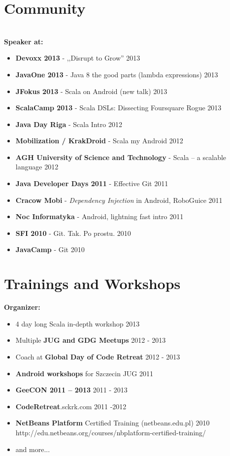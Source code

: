 \documentclass{res}
\begin{document}
\begin{resume}
\section{Community}
\\ 
\textbf{Speaker at:}
\begin{itemize}
 \item \textbf{Devoxx 2013} - ,,Disrupt to Grow'' \hfill 2013
 \item \textbf{JavaOne 2013} - Java 8 the good parts (lambda expressions) \hfill 2013
 \item \textbf{JFokus 2013} - Scala on Android (new talk)    \hfill 2013
 \item \textbf{ScalaCamp 2013} - Scala DSLs: Dissecting Foursquare Rogue    \hfill 2013
 \item\textbf{Java Day Riga} - Scala Intro \hfill 2012
 \item \textbf{Mobilization / KrakDroid} - Scala my Android    \hfill 2012
 \item \textbf{AGH University of Science and Technology} - Scala -- a scalable language    \hfill 2012
 \item \textbf{Java Developer Days 2011} - Effective Git    \hfill 2011
 \item \textbf{Cracow Mobi} - \textit{Dependency Injection} in Android, RoboGuice    \hfill 2011
 \item \textbf{Noc Informatyka} - Android, lightning fast intro    \hfill 2011
 \item \textbf{SFI 2010} - Git. Tak. Po prostu.    \hfill 2010
 \item \textbf{JavaCamp} - Git    \hfill 2010
\end{itemize}


\section{Trainings and Workshops}
{\bf Organizer:}
\begin{itemize}
 \item 4 day long Scala in-depth workshop \hfill 2013
 \item Multiple \textbf{JUG and GDG Meetups} \hfill 2012 - 2013
 \item Coach at \textbf{Global Day of Code Retreat} \hfill 2012 - 2013
 \item \textbf{Android workshops} for Szczecin JUG \hfill 2011
 \item \textbf{GeeCON 2011 -- 2013} \hfill 2011 - 2013
 \item \textbf{CodeRetreat}.sckrk.com \hfill 2011 -2012
 \item \textbf{NetBeans Platform} Certified Training (netbeans.edu.pl) \hfill 2010 \\
	http://edu.netbeans.org/courses/nbplatform-certified-training/ 
 \item and more...
\end{itemize}


\end{resume}
\end{document}
